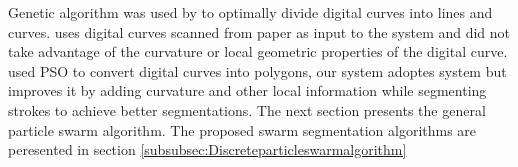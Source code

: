 \documentclass[a4paper,10pt]{IEEEconf}
\begin{document}
Genetic algorithm was used by \cite{CruveDivisionSwarm} to optimally divide digital curves into lines and curves. \citeauthor{CruveDivisionSwarm} uses digital curves scanned from paper as input to the system and did not take advantage of the curvature or local geometric properties of the digital curve. \citeauthor{PolygonApproximationPSO} \cite{PolygonApproximationPSO} used PSO to convert digital curves into polygons, our system adoptes \citeauthor{PolygonApproximationPSO} system but improves it by adding curvature and other local information while segmenting strokes to achieve better segmentations. The next section presents the general particle swarm algorithm. The proposed swarm segmentation algorithms are peresented in section \ref{subsubsec:Discreteparticleswarmalgorithm}
\end{document}
